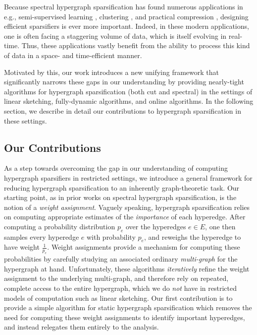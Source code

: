 \documentclass{article}
\begin{document}
 Because spectral hypergraph sparsification has found numerous applications
in e.g., semi-supervised learning
\cite{ZhangHTC20}, clustering \cite{LVSLG21, ZLS22}, and practical compression \cite{BestaWGGIOH19}, designing efficient sparsifiers is ever more important.
Indeed, in these modern applications, one is often facing a staggering volume of data,
which is itself evolving in real-time.
Thus, these applications vastly benefit from the ability to process this kind of data in a space- and time-efficient
manner.

Motivated by this, our work introduces a new unifying framework that significantly narrows these gaps in our understanding by providing nearly-tight algorithms for hypergraph sparsification (both cut and spectral) in the settings of linear sketching, fully-dynamic algorithms, and online algorithms. In the following section, we describe in detail our contributions to hypergraph sparsification in these settings.

\subsection{Our Contributions}

As a step towards overcoming the gap in our understanding of computing hypergraph sparsifiers in restricted settings, we introduce a general framework for reducing hypergraph sparsification to an inherently graph-theoretic task. Our starting point, as in prior works on spectral hypergraph sparsification, is the notion of a \emph{weight assignment}. Vaguely speaking, hypergraph sparsification relies on computing appropriate estimates of the \emph{importance} of each hyperedge. After computing a probability distribution $p_e$ over the hyperedges $e \in E$, one then samples every hyperedge $e$ with probability $p_e$, and reweighs the hyperedge to have weight $\frac{1}{p_e}$. Weight assignments provide a mechanism for computing these probabilities by carefully studying an associated ordinary \emph{multi-graph} for the hypergraph at hand. Unfortunately, these algorithms \emph{iteratively} refine the weight assignment to the underlying multi-graph, and therefore rely on repeated, complete access to the entire hypergraph,
which we do \textit{not} have in restricted models of computation such as linear sketching.
Our first contribution is to provide a simple algorithm for static hypergraph sparsification which removes the need for computing these weight assignments to identify important hyperedges, and instead relegates them entirely to the analysis. 
\end{document}
